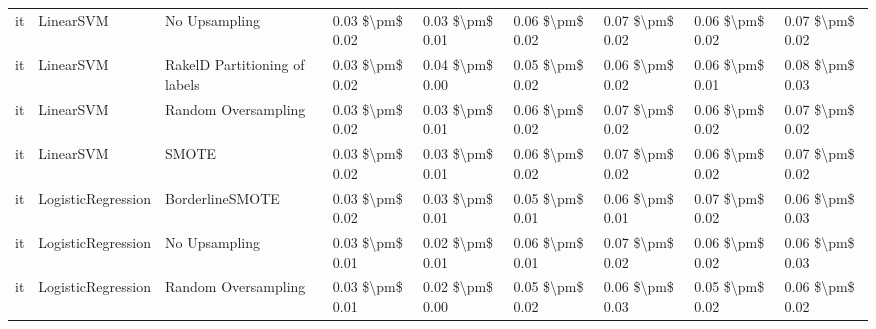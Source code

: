 \begin{tabular}{lllllllll}
      it &                       LinearSVM &                 No Upsampling & 0.03 \$\textbackslash pm\$ 0.02 &           0.03 \$\textbackslash pm\$ 0.01 &       0.06 \$\textbackslash pm\$ 0.02 &        0.07 \$\textbackslash pm\$ 0.02 &                         0.06 \$\textbackslash pm\$ 0.02 &     0.07 \$\textbackslash pm\$ 0.02 \\
      it &                       LinearSVM & RakelD Partitioning of labels & 0.03 \$\textbackslash pm\$ 0.02 &           0.04 \$\textbackslash pm\$ 0.00 &       0.05 \$\textbackslash pm\$ 0.02 &        0.06 \$\textbackslash pm\$ 0.02 &                         0.06 \$\textbackslash pm\$ 0.01 &     0.08 \$\textbackslash pm\$ 0.03 \\
      it &                       LinearSVM &           Random Oversampling & 0.03 \$\textbackslash pm\$ 0.02 &           0.03 \$\textbackslash pm\$ 0.01 &       0.06 \$\textbackslash pm\$ 0.02 &        0.07 \$\textbackslash pm\$ 0.02 &                         0.06 \$\textbackslash pm\$ 0.02 &     0.07 \$\textbackslash pm\$ 0.02 \\
      it &                       LinearSVM &                         SMOTE & 0.03 \$\textbackslash pm\$ 0.02 &           0.03 \$\textbackslash pm\$ 0.01 &       0.06 \$\textbackslash pm\$ 0.02 &        0.07 \$\textbackslash pm\$ 0.02 &                         0.06 \$\textbackslash pm\$ 0.02 &     0.07 \$\textbackslash pm\$ 0.02 \\
      it &              LogisticRegression &               BorderlineSMOTE & 0.03 \$\textbackslash pm\$ 0.02 &           0.03 \$\textbackslash pm\$ 0.01 &       0.05 \$\textbackslash pm\$ 0.01 &        0.06 \$\textbackslash pm\$ 0.01 &                         0.07 \$\textbackslash pm\$ 0.02 &     0.06 \$\textbackslash pm\$ 0.03 \\
      it &              LogisticRegression &                 No Upsampling & 0.03 \$\textbackslash pm\$ 0.01 &           0.02 \$\textbackslash pm\$ 0.01 &       0.06 \$\textbackslash pm\$ 0.01 &        0.07 \$\textbackslash pm\$ 0.02 &                         0.06 \$\textbackslash pm\$ 0.02 &     0.06 \$\textbackslash pm\$ 0.03 \\
      it &              LogisticRegression &           Random Oversampling & 0.03 \$\textbackslash pm\$ 0.01 &           0.02 \$\textbackslash pm\$ 0.00 &       0.05 \$\textbackslash pm\$ 0.02 &        0.06 \$\textbackslash pm\$ 0.03 &                         0.05 \$\textbackslash pm\$ 0.02 &     0.06 \$\textbackslash pm\$ 0.02 \\

\end{tabular}
